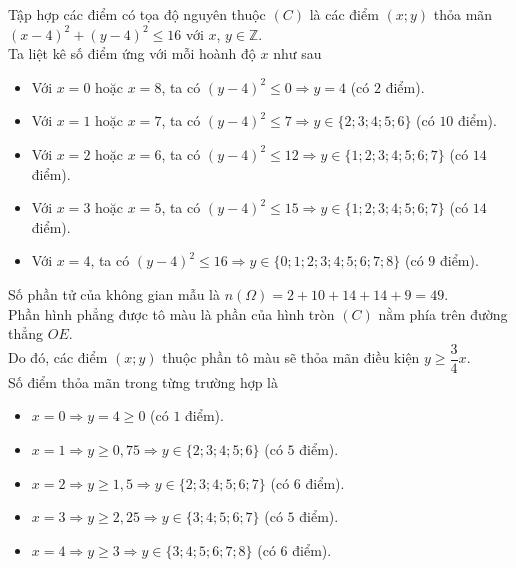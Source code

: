 \begin{ex}
{{
		}
		\noindent Tập hợp các điểm có tọa độ nguyên thuộc $(C)$ là các điểm $(x;y)$ thỏa mãn $(x-4)^2 + (y-4)^2 \le 16$ với $x$, $y \in \mathbb{Z}$. \\
		Ta liệt kê số điểm ứng với mỗi hoành độ $x$ như sau
		\begin{itemize}
			\item Với $x=0$ hoặc $x=8$, ta có $(y-4)^2 \le 0 \Rightarrow y=4$ (có $2$ điểm).
			\item Với $x=1$ hoặc $x=7$, ta có $(y-4)^2 \le 7 \Rightarrow y \in \{2;3;4;5;6\}$ (có $10$ điểm).
			\item Với $x=2$ hoặc $x=6$, ta có $(y-4)^2 \le 12 \Rightarrow y \in \{1;2;3;4;5;6;7\}$ (có $14$ điểm).
			\item Với $x=3$ hoặc $x=5$, ta có $(y-4)^2 \le 15 \Rightarrow y \in \{1;2;3;4;5;6;7\}$ (có $14$ điểm).
			\item Với $x=4$, ta có $(y-4)^2 \le 16 \Rightarrow y \in \{0;1;2;3;4;5;6;7;8\}$ (có $9$ điểm).
		\end{itemize}
		Số phần tử của không gian mẫu là $n(\Omega) = 2 + 10 + 14 + 14 + 9 = 49$.\\
		Phần hình phẳng được tô màu là phần của hình tròn $(C)$ nằm phía trên đường thẳng $OE$.\\
		Do đó, các điểm $(x;y)$ thuộc phần tô màu sẽ thỏa mãn điều kiện $y \ge \dfrac{3}{4}x$. \\
		Số điểm thỏa mãn trong từng trường hợp là
		\begin{itemize}
			\item $x=0 \Rightarrow y=4 \ge 0$ (có $1$ điểm).
			\item $x=1 \Rightarrow y \ge 0{,}75 \Rightarrow y \in \{2;3;4;5;6\}$ (có $5$ điểm).
			\item $x=2 \Rightarrow y \ge 1{,}5 \Rightarrow y \in \{2;3;4;5;6;7\}$ (có $6$ điểm).
			\item $x=3 \Rightarrow y \ge 2{,}25 \Rightarrow y \in \{3;4;5;6;7\}$ (có $5$ điểm).
			\item $x=4 \Rightarrow y \ge 3 \Rightarrow y \in \{3;4;5;6;7;8\}$ (có $6$ điểm).

\end{itemize}}
\end{ex}
